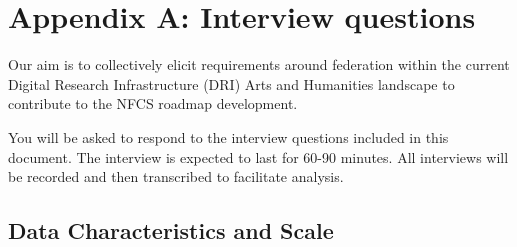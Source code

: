 \documentclass[11pt]{scrartcl}
\begin{document}
\newpage
\section{Appendix A: Interview questions}
\label{interview}
Our aim is to collectively elicit requirements around federation within the current Digital Research Infrastructure (DRI) Arts and Humanities landscape to contribute to the NFCS roadmap development. 

You will be asked to respond to the interview questions included in this document. The interview is expected to last for 60-90 minutes. All interviews will be recorded and then transcribed to facilitate analysis. 
 

\subsection*{\hspace*{1cm}Data Characteristics and Scale}
\end{document}
